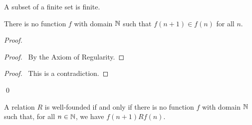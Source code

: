 \begin{corollary}
    A subset of a finite set is finite.
\end{corollary}

\begin{theorem}[Regularity]
    There is no function $f$ with domain $\mathbb{N}$ such that $f(n+1) \in f(n)$ for all $n$.
\end{theorem}

\begin{proof}
    \pf
    \begin{proof}
        \pf\ By the Axiom of Regularity.
    \end{proof}
    \qedstep
    \begin{proof}
        \pf\ This is a contradiction.
    \end{proof}
    \qed
\end{proof}

\begin{theorem}
    A relation $R$ is well-founded if and only if there is no function $f$ with domain $\mathbb{N}$
    such that, for all $n \in \mathbb{N}$, we have $f(n+1) R f(n)$.
\end{theorem}